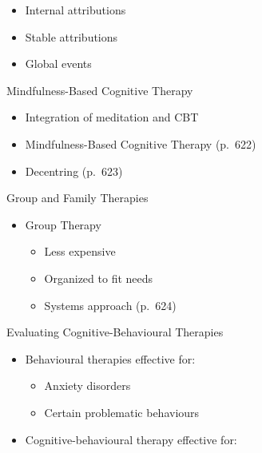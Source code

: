\documentclass[
]{book}
\providecommand{\tightlist}{%
  \setlength{\itemsep}{0pt}\setlength{\parskip}{0pt}}
\begin{document}
\begin{reflect}
\begin{itemize}
  \begin{itemize}
  \tightlist
  \item
    Internal attributions\\
  \item
    Stable attributions\\
  \item
    Global events
  \end{itemize}
\end{itemize}

Mindfulness-Based Cognitive Therapy

\begin{itemize}
\tightlist
\item
  Integration of meditation and CBT\\
\item
  Mindfulness-Based Cognitive Therapy (p.~622)\\
\item
  Decentring (p.~623)
\end{itemize}

Group and Family Therapies

\begin{itemize}
\tightlist
\item
  Group Therapy

  \begin{itemize}
  \tightlist
  \item
    Less expensive\\
  \item
    Organized to fit needs\\
  \item
    Systems approach (p.~624)
  \end{itemize}
\end{itemize}

Evaluating Cognitive-Behavioural Therapies

\begin{itemize}
\tightlist
\item
  Behavioural therapies effective for:

  \begin{itemize}
  \tightlist
  \item
    Anxiety disorders\\
  \item
    Certain problematic behaviours\\
  \end{itemize}
\item
  Cognitive-behavioural therapy effective for:


\end{itemize}
\end{reflect}
\end{document}
